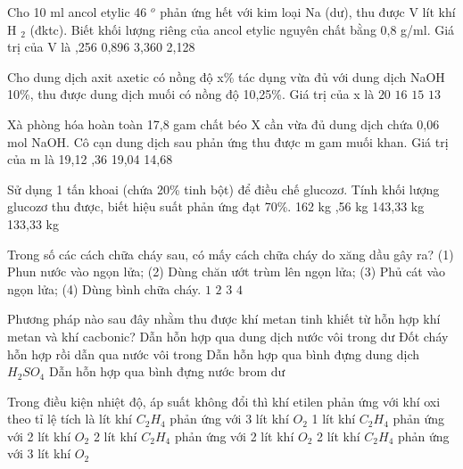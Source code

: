 \begin{ex}
	Cho 10 ml ancol etylic 46 $^o$ phản ứng hết với kim loại Na (dư), thu được V lít khí H $_2$ (đktc). Biết khối lượng riêng của ancol etylic nguyên chất bằng 0,8 g/ml. Giá trị của V là
	\choice
	{,256}
	{0,896}
	{3,360}
	{2,128}
	\loigiai{}
\end{ex}
\begin{ex}
	Cho dung dịch axit axetic có nồng độ x\% tác dụng vừa đủ với dung dịch NaOH 10\%, thu được dung dịch muối có nồng độ 10,25\%. Giá trị của x là
	\choice
	{$20$}
	{$16$}
	{\True $15$}
	{$13$}
	\loigiai{}
\end{ex}
\begin{ex} Xà phòng hóa hoàn toàn 17,8 gam chất béo X cần vừa đủ dung dịch chứa 0,06 mol NaOH. Cô cạn dung dịch sau phản ứng thu được m gam muối khan. Giá trị của m là
	\choice
	{19,12}
	{,36}
	{19,04}
	{14,68}
	\loigiai{}
\end{ex}
\begin{ex}
	Sử dụng 1 tấn khoai (chứa 20\% tinh bột) để điều chế glucozơ. Tính khối lượng glucozơ thu được, biết hiệu suất phản ứng đạt 70\%.
	\choice
	{162 kg}
	{,56 kg}
	{143,33 kg}
	{133,33 kg}
	\loigiai{}
\end{ex}
\begin{ex}
	Trong số các cách chữa cháy sau, có mấy cách chữa cháy do xăng dầu gây ra?
	(1) Phun nước vào ngọn lửa;
	(2) Dùng chăn ướt trùm lên ngọn lửa;
	(3) Phủ cát vào ngọn lửa;
	(4) Dùng bình chữa cháy.
	\choice
	{$1$}
	{$2$}
	{\True $3$}
	{$4$}
	\loigiai{}
\end{ex}
\begin{ex}
	Phương pháp nào sau đây nhằm thu được khí metan tinh khiết từ hỗn hợp khí metan và khí cacbonic?
	\choice
	{\True Dẫn hỗn hợp qua dung dịch nước vôi trong dư}
	{Đốt cháy hỗn hợp rồi dẫn qua nước vôi trong}
	{Dẫn hỗn hợp qua bình đựng dung dịch $H_2SO_4$}
	{Dẫn hỗn hợp qua bình đựng nước brom dư}
	\loigiai{}
\end{ex}
\begin{ex}
	Trong điều kiện nhiệt độ, áp suất không đổi thì khí etilen phản ứng với khí oxi theo tỉ lệ tích là
	\choice
	{ lít khí $C_2H_4$ phản ứng với 3 lít khí $O_2$}
	{1 lít khí $C_2 H_4$ phản ứng với 2 lít khí $O_2$}
	{2 lít khí $C_2H_4$ phản ứng với 2 lít khí $O_2$}
	{2 lít khí $C_2H_4$ phản ứng với 3 lít khí $O_2$}
	\loigiai{}
\end{ex}
